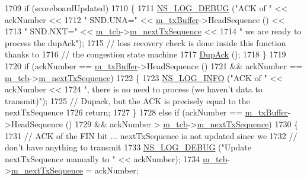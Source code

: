 \begin{DoxyCode}
1709   \textcolor{keywordflow}{if} (scoreboardUpdated)
1710     \{
1711       \hyperlink{group__logging_ga413f1886406d49f59a6a0a89b77b4d0a}{NS\_LOG\_DEBUG} (\textcolor{stringliteral}{"ACK of "} << ackNumber <<
1712                     \textcolor{stringliteral}{" SND.UNA="} << \hyperlink{classns3_1_1TcpSocketBase_a4a1b53982ffd851bd07ab8d5005c130e}{m\_txBuffer}->HeadSequence () <<
1713                     \textcolor{stringliteral}{" SND.NXT="} << \hyperlink{classns3_1_1TcpSocketBase_a26bbaf59001308dc43fb630d76f2e38b}{m\_tcb}->\hyperlink{classns3_1_1TcpSocketState_ad1f77b1cbdb9267a89ebb6f16ac76892}{m\_nextTxSequence} <<
1714                     \textcolor{stringliteral}{" we are ready to process the dupAck"});
1715       \textcolor{comment}{// loss recovery check is done inside this function thanks to}
1716       \textcolor{comment}{// the congestion state machine}
1717       \hyperlink{classns3_1_1TcpSocketBase_a9139f54e2cdf0f1a796011a43dabfad5}{DupAck} ();
1718     \}
1719 
1720   \textcolor{keywordflow}{if} (ackNumber == \hyperlink{classns3_1_1TcpSocketBase_a4a1b53982ffd851bd07ab8d5005c130e}{m\_txBuffer}->HeadSequence ()
1721       && ackNumber == \hyperlink{classns3_1_1TcpSocketBase_a26bbaf59001308dc43fb630d76f2e38b}{m\_tcb}->\hyperlink{classns3_1_1TcpSocketState_ad1f77b1cbdb9267a89ebb6f16ac76892}{m\_nextTxSequence})
1722     \{
1723       \hyperlink{group__logging_gafbd73ee2cf9f26b319f49086d8e860fb}{NS\_LOG\_INFO} (\textcolor{stringliteral}{"ACK of "} << ackNumber <<
1724                    \textcolor{stringliteral}{", there is no need to process (we haven't data to transmit)"});
1725       \textcolor{comment}{// Dupack, but the ACK is precisely equal to the nextTxSequence}
1726       \textcolor{keywordflow}{return};
1727     \}
1728   \textcolor{keywordflow}{else} \textcolor{keywordflow}{if} (ackNumber == \hyperlink{classns3_1_1TcpSocketBase_a4a1b53982ffd851bd07ab8d5005c130e}{m\_txBuffer}->HeadSequence ()
1729            && ackNumber > \hyperlink{classns3_1_1TcpSocketBase_a26bbaf59001308dc43fb630d76f2e38b}{m\_tcb}->\hyperlink{classns3_1_1TcpSocketState_ad1f77b1cbdb9267a89ebb6f16ac76892}{m\_nextTxSequence})
1730     \{
1731       \textcolor{comment}{// ACK of the FIN bit ... nextTxSequence is not updated since we}
1732       \textcolor{comment}{// don't have anything to transmit}
1733       \hyperlink{group__logging_ga413f1886406d49f59a6a0a89b77b4d0a}{NS\_LOG\_DEBUG} (\textcolor{stringliteral}{"Update nextTxSequence manually to "} << ackNumber);
1734       \hyperlink{classns3_1_1TcpSocketBase_a26bbaf59001308dc43fb630d76f2e38b}{m\_tcb}->\hyperlink{classns3_1_1TcpSocketState_ad1f77b1cbdb9267a89ebb6f16ac76892}{m\_nextTxSequence} = ackNumber;

\end{DoxyCode}
